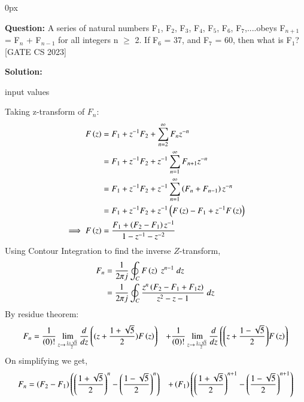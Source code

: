\documentclass[journal,12pt]{IEEEtran}
\begin{document}
	\parindent 0px
	

	\title{}
	\author{EE23BTECH11209 - K S Ballvardhan$^{*}$}
	\maketitle
	\newpage
	\bigskip
	
	
	
	\textbf{Question:} A series of natural numbers F$_1$, F$_2$, F$_3$, F$_4$, F$_5$, F$_6$, F$_7$,....obeys F$_{n+1}$ = F$_n$ + F$_{n-1}$ for all integers n $\geq$ 2.
	If F$_6$ = 37, and F$_7$ = 60, then what is F$_1$? \hfill[GATE CS 2023]
	
	\textbf{Solution: }
	
	\begin{table}[ht] 
		\centering
		
		\caption{input values}
		\label{tab: Table2023cs3}
	\end{table}
    Taking z-transform of $ F_n$:
	\begin{align}
		F\left(z\right) &= F_1 + z^{-1} F_2 + \sum_{n=2}^{\infty} F_n z^{-n}\\
	    &= F_1 + z^{-1} F_2 + z^{-1} \sum_{n=1}^{\infty} F_{n+1} z^{-n}\\
	    &= F_1 + z^{-1} F_2 + z^{-1} \sum_{n=1}^{\infty} \left(F_n + F_{n-1}\right)z^{-n}\\
	    &= F_1 + z^{-1} F_2 + z^{-1}\left(F\left(z\right)-F_1 + z^{-1}F\left(z\right)\right)\\
		\implies F\left(z\right)&= \frac{F_1 + \left(F_2-F_1\right)z^{-1}}{1-z^{-1}-z^{-2}}
	\end{align}
	Using Contour Integration to find the inverse $Z$-transform,
	\begin{align}
		F_{n}&=\frac{1}{2\pi j}\oint_{C} F\left(z\right) \;z^{n-1} \;dz  \\
		&=\frac{1}{2\pi j}\oint_{C}\frac{z^{n}\left(F_2-F_1+F_1 z\right)}{z^2-z-1} \;dz 
	\end{align}
	By residue theorem:
	\begin{align}
		F_n&=\frac{1}{\left(0\right)!}\lim\limits_{z\to {\frac{1+\sqrt{5}}{2}}}\frac{d}{dz}\left({(z+\frac{1+\sqrt{5}}{2})}F\left(z\right)\right) &+ \frac{1}{\left(0\right)!}\lim\limits_{z\to \frac{1-\sqrt{5}}{2}}\frac{d}{dz}\left({\left(z+\frac{1-\sqrt{5}}{2}\right)}F\left(z\right)\right)
	\end{align}
	On simplifying we get,
	\begin{align}
		F_n &= \left(F_2-F_1\right)\left(\left(\frac{1+\sqrt{5}}{2}\right)^n-\left(\frac{1-\sqrt{5}}{2}\right)^n\right) &+ \left(F_1\right)\left(\left(\frac{1+\sqrt{5}}{2}\right)^{n+1}-\left(\frac{1-\sqrt{5}}{2}\right)^{n+1}\right)
	\end{align}
\end{document}
